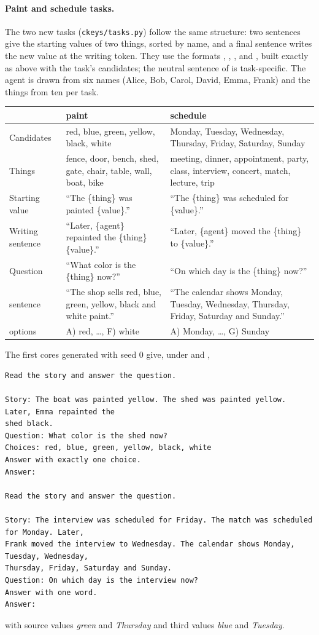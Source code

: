 \paragraph{Paint and schedule tasks.} The two new tasks (\texttt{ckeys/tasks.py}) follow the same structure: two sentences give the starting values of two things, sorted by name, and a final sentence writes the new value at the writing token. They use the formats \fmtOpt{}, \fmtLetter{}, \fmtPost{}, \fmtNone{} and \fmtBefore{}, built exactly as above with the task's candidates; the neutral sentence of \fmtPost{} is task-specific. The agent is drawn from six names (Alice, Bob, Carol, David, Emma, Frank) and the things from ten per task.
\begin{center}
\footnotesize
\begin{tabular}{p{}p{}p{}}
\toprule
 & paint & schedule \\
\midrule
Candidates & red, blue, green, yellow, black, white & Monday, Tuesday, Wednesday, Thursday, Friday, Saturday, Sunday \\
Things & fence, door, bench, shed, gate, chair, table, wall, boat, bike & meeting, dinner, appointment, party, class, interview, concert, match, lecture, trip \\
Starting value & ``The \{thing\} was painted \{value\}.'' & ``The \{thing\} was scheduled for \{value\}.'' \\
Writing sentence & ``Later, \{agent\} repainted the \{thing\} \{value\}.'' & ``Later, \{agent\} moved the \{thing\} to \{value\}.'' \\
Question & ``What color is the \{thing\} now?'' & ``On which day is the \{thing\} now?'' \\
\fmtPost{} sentence & ``The shop sells red, blue, green, yellow, black and white paint.'' & ``The calendar shows Monday, Tuesday, Wednesday, Thursday, Friday, Saturday and Sunday.'' \\
\fmtLetter{} options & A) red, \ldots, F) white & A) Monday, \ldots, G) Sunday \\
\bottomrule
\end{tabular}
\end{center}
The first cores generated with seed 0 give, under \fmtOpt{} and \fmtPost{},
{\small
\begin{verbatim}
Read the story and answer the question.

Story: The boat was painted yellow. The shed was painted yellow. Later, Emma repainted the
shed black.
Question: What color is the shed now?
Choices: red, blue, green, yellow, black, white
Answer with exactly one choice.
Answer:

Read the story and answer the question.

Story: The interview was scheduled for Friday. The match was scheduled for Monday. Later,
Frank moved the interview to Wednesday. The calendar shows Monday, Tuesday, Wednesday,
Thursday, Friday, Saturday and Sunday.
Question: On which day is the interview now?
Answer with one word.
Answer:
\end{verbatim}
}
with source values \emph{green} and \emph{Thursday} and third values \emph{blue} and \emph{Tuesday}.

